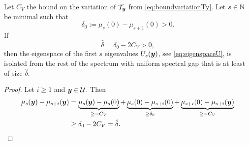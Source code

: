 \begin{lemma}\label{lemma:uniformSpectralGap}
    Let $C_V$ the bound on the variation of $\mathcal{T}_{\boldsymbol{y}}$ from \eqref{eq:boundvariationTy}. %
    Let  $s \in \mathbb{N}$ be minimal such that 
    \begin{equation}\label{eq:def_delta0}
        \delta_0 := \mu_{s}(0)-\mu_{s+1}(0)  > 0. 
    \end{equation} 
    If 
    \begin{equation}\label{eq:def_delta_hat}
        \hat \delta = \delta_0 -2C_V > 0,
    \end{equation} then the eigenspace of the first $s$ eigenvalues $U_s({\boldsymbol{y}})$, see \eqref{eq:eigenspaceU}, is isolated from the rest of the spectrum with uniform spectral gap that is at least of size $\hat \delta$.
\end{lemma}
\begin{proof}
Let $i \geq 1$ and ${\boldsymbol{y}} \in \mathcal{U}$. 
    Then 
    \begin{align*}
        \mu_s({\boldsymbol{y}}) - \mu_{s+i}({\boldsymbol{y}})  & = \underbrace{\mu_s({\boldsymbol{y}})- \mu_s(0)}_{\geq -C_V } + \underbrace{\mu_s(0) - \mu_{s+i}(0)}_{\geq \delta_0}  + \underbrace{\mu_{s+i}(0) - \mu_{s+i}({\boldsymbol{y}})}_{\geq -C_V} \\
        &\geq \delta_0 -2C_V = \hat \delta.
    \end{align*}
\end{proof}
